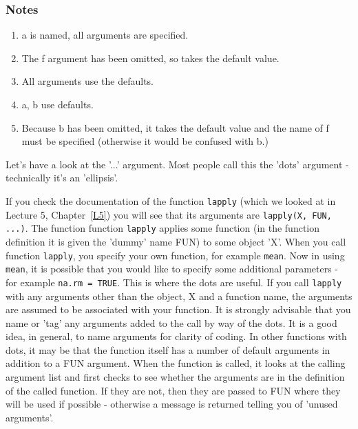 \documentclass[titlepage]{book}\usepackage{knitr}
\begin{document}
\subsubsection{Notes}
\begin{enumerate}
\item{a is named, all arguments are specified.}
\item{The f argument has been omitted, so takes the default value.}
\item{All arguments use the defaults.}
\item{a, b use defaults.}
\item{Because b has been omitted, it takes the default value and the name of f must be specified (otherwise it would be confused with b.)}

\end{enumerate}
Let's have a look at the '...' argument.  Most people call this the 'dots' argument - technically it's an 'ellipsis'. 

If you check the documentation of the function \texttt{lapply} (which we looked at in Lecture 5, Chapter~\ref{L5}) you will see that its arguments are \texttt{lapply(X, FUN, ...)}. The function function \texttt{lapply}  applies some function (in the function definition it is given the 'dummy' name FUN) to some object 'X'. When you call function \texttt{lapply}, you specify your own function, for example \texttt{mean}.  Now in using  \texttt{mean}, it is possible that you would like to specify some additional parameters -  for example  \texttt{na.rm = TRUE}.  This is where the dots are useful. If you call \texttt{lapply} with any arguments other than the object, X and a function name, the arguments are assumed to be associated with your function.  It is strongly advisable that you name or 'tag' any arguments added to the call by way of the dots. It is a good idea, in general, to name arguments for clarity of coding.
In other functions with dots, it may be that the function itself has a number of default arguments in addition to a FUN argument. When the function is called, it looks at the calling argument list and first checks to see whether the arguments are in the definition of the called function. If they are not, then they are passed to FUN where they will be used if possible - otherwise a message is returned telling you of 'unused arguments'.
\end{document}
